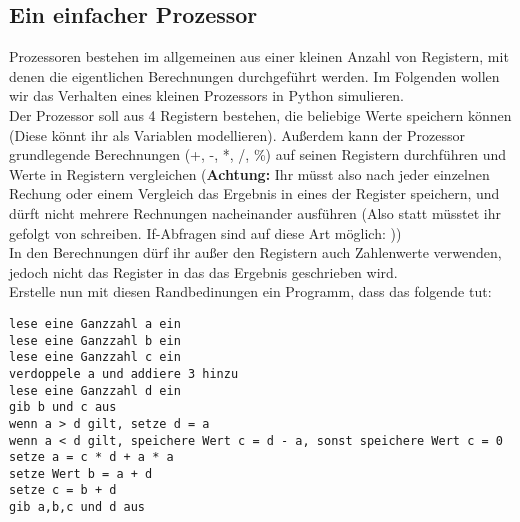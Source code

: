 \subsection{Ein einfacher Prozessor}
Prozessoren bestehen im allgemeinen aus einer kleinen Anzahl von Registern, mit denen die eigentlichen Berechnungen durchgeführt werden. Im Folgenden wollen wir das Verhalten eines kleinen Prozessors in Python simulieren. \\
Der Prozessor soll aus 4 Registern bestehen, die beliebige Werte speichern können (Diese könnt ihr als Variablen modellieren). Außerdem kann der Prozessor grundlegende Berechnungen (+, -, *, /, \%) auf seinen Registern durchführen und Werte in Registern vergleichen (\textbf{Achtung:} Ihr müsst also nach jeder einzelnen Rechung oder einem Vergleich das Ergebnis in eines der Register speichern, und dürft nicht mehrere Rechnungen nacheinander ausführen (Also statt  müsstet ihr  gefolgt von  schreiben. If-Abfragen sind auf diese Art möglich: )) \\
In den Berechnungen dürf ihr außer den Registern auch Zahlenwerte verwenden, jedoch nicht das Register in das das Ergebnis geschrieben wird.\\
Erstelle nun mit diesen Randbedinungen ein Programm, dass das folgende tut: \\
\begin{lstlisting}
lese eine Ganzzahl a ein
lese eine Ganzzahl b ein
lese eine Ganzzahl c ein
verdoppele a und addiere 3 hinzu
lese eine Ganzzahl d ein
gib b und c aus
wenn a > d gilt, setze d = a
wenn a < d gilt, speichere Wert c = d - a, sonst speichere Wert c = 0
setze a = c * d + a * a
setze Wert b = a + d
setze c = b + d
gib a,b,c und d aus
\end{lstlisting}